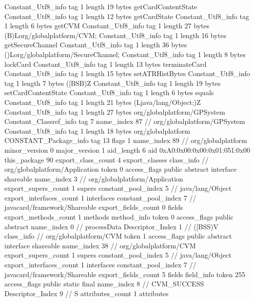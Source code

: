 {{{		}
		Constant_Utf8_info {
			tag	1
			length	19
			bytes	getCardContentState
		}
		Constant_Utf8_info {
			tag	1
			length	12
			bytes	getCardState
		}
		Constant_Utf8_info {
			tag	1
			length	6
			bytes	getCVM
		}
		Constant_Utf8_info {
			tag	1
			length	27
			bytes	(B)Lorg/globalplatform/CVM;
		}
		Constant_Utf8_info {
			tag	1
			length	16
			bytes	getSecureChannel
		}
		Constant_Utf8_info {
			tag	1
			length	36
			bytes	()Lorg/globalplatform/SecureChannel;
		}
		Constant_Utf8_info {
			tag	1
			length	8
			bytes	lockCard
		}
		Constant_Utf8_info {
			tag	1
			length	13
			bytes	terminateCard
		}
		Constant_Utf8_info {
			tag	1
			length	15
			bytes	setATRHistBytes
		}
		Constant_Utf8_info {
			tag	1
			length	7
			bytes	([BSB)Z
		}
		Constant_Utf8_info {
			tag	1
			length	19
			bytes	setCardContentState
		}
		Constant_Utf8_info {
			tag	1
			length	6
			bytes	equals
		}
		Constant_Utf8_info {
			tag	1
			length	21
			bytes	(Ljava/lang/Object;)Z
		}
		Constant_Utf8_info {
			tag	1
			length	27
			bytes	org/globalplatform/GPSystem
		}
		Constant_Classref_info {
			tag	7
			name_index	87		// org/globalplatform/GPSystem
		}
		Constant_Utf8_info {
			tag	1
			length	18
			bytes	org/globalplatform
		}
		CONSTANT_Package_info {
			tag	13
			flags	1
			name_index	89		// org/globalplatform
			minor_version	0
			major_version	1
			aid_length	6
			aid	0xA0:0x00:0x00:0x01:051:0x00
		}
	}
	this_package	90
	export_class_count	4
	export_classes {
		class_info {		// org/globalplatform/Application
			token	0
			access_flags	public abstract interface shareable
			name_index	3		// org/globalplatform/Application
			export_supers_count	1
			supers {
				constant_pool_index	5		// java/lang/Object
			}
			export_interfaces_count	1
			interfaces {
				constant_pool_index	7		// javacard/framework/Shareable
			}
			export_fields_count	0
			fields {
			}
			export_methods_count	1
			methods {
				method_info {
					token	0
					access_flags	public abstract
					name_index	0		// processData
					Descriptor_Index	1		// ([BSS)V
				}
			}
		}
		class_info {		// org/globalplatform/CVM
			token	1
			access_flags	public abstract interface shareable
			name_index	38		// org/globalplatform/CVM
			export_supers_count	1
			supers {
				constant_pool_index	5		// java/lang/Object
			}
			export_interfaces_count	1
			interfaces {
				constant_pool_index	7		// javacard/framework/Shareable
			}
			export_fields_count	5
			fields {
			field_info {
				token	255
				access_flags	public static final
				name_index	8		// CVM_SUCCESS
				Descriptor_Index	9		// S
				attributes_count	1
				attributes {
}}}}}}

